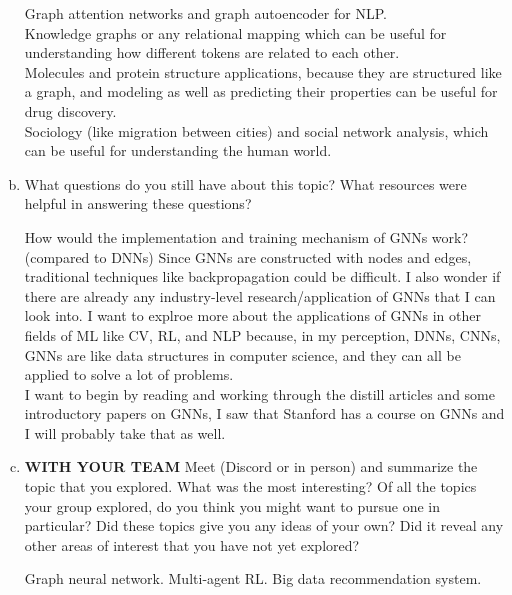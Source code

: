 \documentclass[letterpaper,11pt]{article}
\begin{document}
\begin{enumerate}[a)]
\begin{tcolorbox}
    Graph attention networks and graph autoencoder for NLP.\\
    Knowledge graphs or any relational mapping which can be useful for understanding how different tokens
    are related to each other.\\
    Molecules and protein structure applications, because they are structured like a graph, and modeling
    as well as predicting their properties can be useful for drug discovery.\\
    Sociology (like migration between cities) and social network analysis,
    which can be useful for understanding the human world.
\end{tcolorbox}

\pagebreak
\item What questions do you still have about this topic? What resources were helpful in answering these questions?

\begin{tcolorbox}
    How would the implementation and training mechanism of GNNs work? (compared to DNNs) Since GNNs are
    constructed with nodes and edges, traditional techniques like backpropagation could be difficult.
    I also wonder if there are already any industry-level research/application of GNNs that I can look into.
    I want to explroe more about the applications of GNNs in other fields of ML like CV, RL, and NLP because,
    in my perception, DNNs, CNNs, GNNs are like data structures in computer science, and they can all be
    applied to solve a lot of problems.\\
    I want to begin by reading and working through the distill articles and some introductory papers on GNNs,
    I saw that Stanford has a course on GNNs and I will probably take that as well.
\end{tcolorbox}

\item \textbf{WITH YOUR TEAM} Meet (Discord or in person) and summarize the topic that you explored. What was the most interesting? Of all the topics your group explored, do you think you might want to pursue one in particular? Did these topics give you any ideas of your own? Did it reveal any other areas of interest that you have not yet explored?

\begin{tcolorbox}
    Graph neural network. Multi-agent RL. Big data recommendation system.
\end{tcolorbox}

\end{enumerate}
\end{document}
